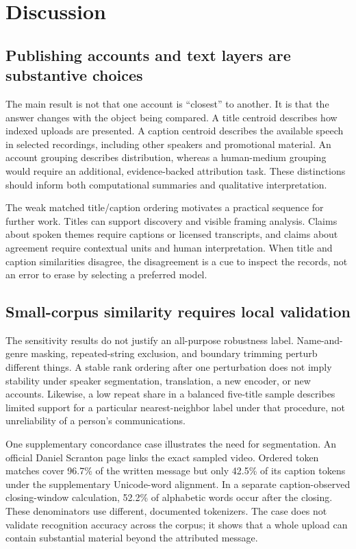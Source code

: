 \section{Discussion}
\subsection{Publishing accounts and text layers are substantive choices}
The main result is not that one account is ``closest'' to another. It is that the answer changes with the object being compared. A title centroid describes how indexed uploads are presented. A caption centroid describes the available speech in selected recordings, including other speakers and promotional material. An account grouping describes distribution, whereas a human-medium grouping would require an additional, evidence-backed attribution task. These distinctions should inform both computational summaries and qualitative interpretation.

The weak matched title/caption ordering motivates a practical sequence for further work. Titles can support discovery and visible framing analysis. Claims about spoken themes require captions or licensed transcripts, and claims about agreement require contextual units and human interpretation. When title and caption similarities disagree, the disagreement is a cue to inspect the records, not an error to erase by selecting a preferred model.

\subsection{Small-corpus similarity requires local validation}
The sensitivity results do not justify an all-purpose robustness label. Name-and-genre masking, repeated-string exclusion, and boundary trimming perturb different things. A stable rank ordering after one perturbation does not imply stability under speaker segmentation, translation, a new encoder, or new accounts. Likewise, a low repeat share in a balanced five-title sample describes limited support for a particular nearest-neighbor label under that procedure, not unreliability of a person's communications.

One supplementary concordance case illustrates the need for segmentation. An official Daniel Scranton page links the exact sampled video. Ordered token matches cover 96.7\% of the written message but only 42.5\% of its caption tokens under the supplementary Unicode-word alignment. In a separate caption-observed closing-window calculation, 52.2\% of alphabetic words occur after the closing. These denominators use different, documented tokenizers. The case does not validate recognition accuracy across the corpus; it shows that a whole upload can contain substantial material beyond the attributed message.

